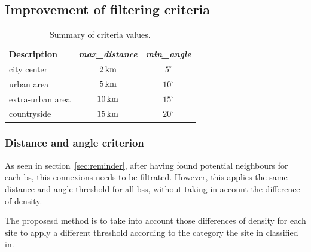 \documentclass[lettersize,journal,english]{IEEEtran}
\begin{document}

    \subsection{Improvement of filtering criteria}
        \begin{table}
            \centering
            \caption{Summary of criteria values.}
            \label{table:crit_summary}
            \begin{tabular}{lcc}
                \toprule
                \textbf{Description} & \textbf{\emph{max\_distance}} & \textbf{\emph{min\_angle}} \\
                \cmidrule(lr){1-3}
                city center & $\unit[2]{km}$ & $5^\circ$ \\
                urban area & $\unit[5]{km}$ & $10^\circ$ \\
                extra-urban area & $\unit[10]{km}$ & $15^\circ$ \\
                countryside & $\unit[15]{km}$ & $20^\circ$ \\
                \bottomrule
            \end{tabular}
        \end{table}

        \subsubsection{Distance and angle criterion}
            As seen in section~\ref{sec:reminder}, after having found potential neighbours for each \acrshort{bs}, this connexions needs to be filtrated. However, this applies the same distance and angle threshold for all \acrshort{bs}s, without taking in account the difference of density.

            The proposesd method is to take into account those differences of density for each site to apply a different threshold according to the category the site in classified in.
\end{document}

